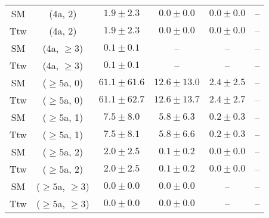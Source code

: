 \begin{table}[h!]
{\begin{tabular}{cccccc}
	SM & (4a, 2) & $1.9\pm 2.3$ & $0.0\pm 0.0$ & $0.0\pm 0.0$ & -- \\[0.5ex] 
	Ttw & (4a, 2) & $1.9\pm 2.3$ & $0.0\pm 0.0$ & $0.0\pm 0.0$ & -- \\[0.5ex] 
	SM & (4a, $\ge3$) & $0.1\pm 0.1$ & -- & -- & -- \\[0.5ex] 
	Ttw & (4a, $\ge3$) & $0.1\pm 0.1$ & -- & -- & -- \\[0.5ex] 
	SM & ($\ge5$a, 0) & $61.1\pm 61.6$ & $12.6\pm 13.0$ & $2.4\pm 2.5$ & -- \\[0.5ex] 
	Ttw & ($\ge5$a, 0) & $61.1\pm 62.7$ & $12.6\pm 13.7$ & $2.4\pm 2.7$ & -- \\[0.5ex] 
	SM & ($\ge5$a, 1) & $7.5\pm 8.0$ & $5.8\pm 6.3$ & $0.2\pm 0.3$ & -- \\[0.5ex] 
	Ttw & ($\ge5$a, 1) & $7.5\pm 8.1$ & $5.8\pm 6.6$ & $0.2\pm 0.3$ & -- \\[0.5ex] 
	SM & ($\ge5$a, 2) & $2.0\pm 2.5$ & $0.1\pm 0.2$ & $0.0\pm 0.0$ & -- \\[0.5ex] 
	Ttw & ($\ge5$a, 2) & $2.0\pm 2.5$ & $0.1\pm 0.2$ & $0.0\pm 0.0$ & -- \\[0.5ex] 
	SM & ($\ge5$a, $\ge3$) & $0.0\pm 0.0$ & $0.0\pm 0.0$ & -- & -- \\[0.5ex] 
	Ttw & ($\ge5$a, $\ge3$) & $0.0\pm 0.0$ & $0.0\pm 0.0$ & -- & -- \\[0.5ex] 
	\hline
	\hline
\end{tabular}}
\end{table}
